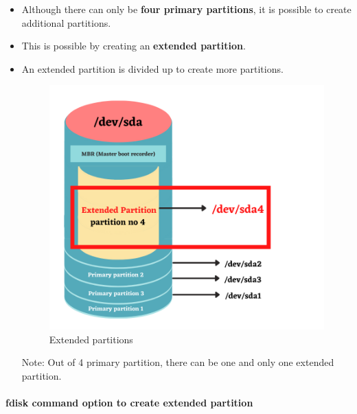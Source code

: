 \setlength{\columnsep}{3pt}
\begin{flushleft}

	\begin{itemize}
		\item Although there can only be \textbf{four primary partitions}, it is possible to create additional partitions.
		\item This is possible by creating an \textbf{extended partition}.
		\item An extended partition is divided up to create more partitions.
		\begin{figure}[h!]
			\centering
			\includegraphics[scale=.6]{content/chapter8/images/ex.png}
			\caption{Extended partitions}
			\label{extended_naming}
		\end{figure}		
			\begin{tcolorbox}[breakable,notitle,boxrule=-2pt,colback=yellow,colframe=yellow]
			\color{black}
			\bigskip
			Note: Out of 4 primary partition, there can be one and only one extended partition.
			\bigskip
		\end{tcolorbox}
		
	\end{itemize}
	
\newpage

\paragraph{fdisk command option to create extended partition}


\end{flushleft}
